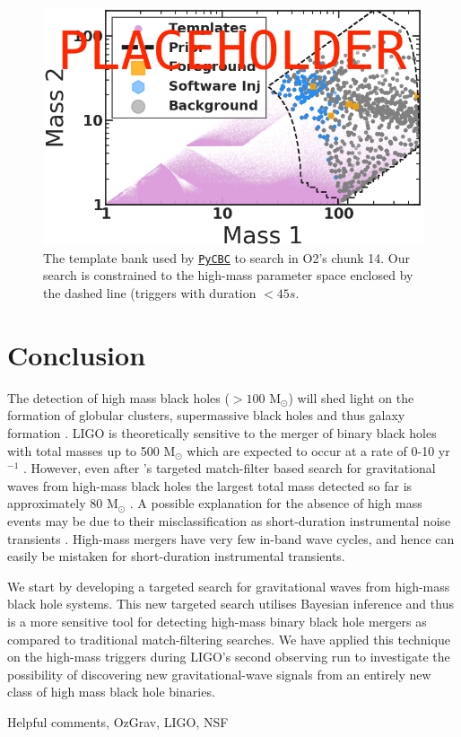 \documentclass[%
 reprint,
 amsmath,amssymb,
 aps,
]{revtex4}
\begin{document}
\begin{figure}[!h]

{\centering \includegraphics[width=0.75\linewidth]{images/template_bank_masses} 

}

\caption[High-mass BCR search space.]{The template bank used by \href{https://pycbc.org/}{\texttt{PyCBC}} to search in O2's chunk 14. Our search is constrained to the high-mass parameter space enclosed by the dashed line (triggers with duration \(<45s\).}\label{fig:templateBank}
\end{figure}




\section{\label{sec:Conclusion}Conclusion}
The detection of high mass black holes (\(>100\) M\({}_\odot\)) will shed light on the formation of globular clusters,
supermassive black holes and thus galaxy formation \citep{lodato2006supermassive, 2018IMBHreview}. LIGO is theoretically
sensitive to the merger of binary black holes with total masses up to 500 M\({}_\odot\) which are expected to occur at a
rate of 0-10 yr\(^{-1}\) \citep[\citet{mandel2008rates}]{fregeau2006imbhbRatePrediction}. However, even after \citet{salemi2019search}'s
targeted match-filter based search for gravitational waves from high-mass black holes the largest total mass detected so
far is approximately 80 M\({}_\odot\) \citep{abbott2019gwtc}. A possible explanation for the absence of high mass events may be
due to their misclassification as short-duration instrumental noise transients \citep{blipGlitches}. High-mass mergers have
very few in-band wave cycles, and hence can easily be mistaken for short-duration instrumental transients. 

We start by developing a targeted search for gravitational waves from high-mass black hole systems. This new targeted
search utilises Bayesian inference and thus is a more sensitive tool for detecting high-mass binary black hole mergers
as compared to traditional match-filtering searches. We have applied this technique on the high-mass triggers during
LIGO's second observing run to investigate the possibility of discovering new gravitational-wave signals from an
entirely new class of high mass black hole binaries.

\begin{acknowledgments}
Helpful comments, OzGrav, LIGO, NSF

\end{acknowledgments}



\end{document}
